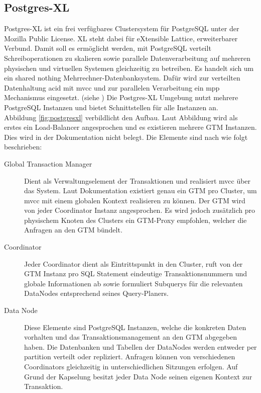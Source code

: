 \subsection{Postgres-XL}
\label{grundlagen:postgresxl}
Postgres-XL ist ein frei verfügbares Clustersystem für PostgreSQL unter der Mozilla Public License.
XL steht dabei für eXtensible Lattice, erweiterbarer Verbund.
Damit soll es ermöglicht werden, mit PostgreSQL verteilt Schreiboperationen zu skalieren sowie parallele Datenverarbeitung auf mehreren physischen und virtuellen Systemen gleichzeitig zu betreiben.
Es handelt sich um ein shared nothing Mehrrechner-Datenbanksystem.
Dafür wird zur verteilten Datenhaltung \Gls{acid} mit \Gls{mvcc} und zur parallelen Verarbeitung ein \Gls{mpp} Mechanismus eingesetzt. (siehe \cite{website:postgresxl-about})
Die Postgres-XL Umgebung nutzt mehrere PostgreSQL Instanzen und bietet Schnittstellen für alle Instanzen an.\\
Abbildung \ref{fig:postgresxl} verbildlicht den Aufbau.
Laut Abbildung wird als erstes ein Load-Balancer angesprochen und es existieren mehrere GTM Instanzen.
Dies wird in der Dokumentation nicht belegt.
Die Elemente sind nach \cite{website:postgresxl-about} wie folgt beschrieben:
\begin{description}
\item[Global Transaction Manager] Dient als Verwaltungselement der Transaktionen und realisiert \Gls{mvcc} über das System. Laut Dokumentation existiert genau ein GTM pro Cluster, um \Gls{mvcc}  mit einem globalen Kontext realisieren zu können. Der GTM wird von jeder Coordinator Instanz angesprochen. Es wird jedoch zusätzlich pro physischem Knoten des Clusters ein GTM-Proxy empfohlen, welcher die Anfragen an den GTM bündelt.
\item[Coordinator] Jeder Coordinator dient als Eintrittspunkt in den Cluster, ruft von der GTM Instanz pro SQL Statement eindeutige Transaktionsnummern und globale Informationen ab sowie formuliert Subquerys für die relevanten DataNodes entsprechend seines Query-Planers.
\item[Data Node] Diese Elemente sind PostgreSQL Instanzen, welche die konkreten Daten vorhalten und das Transaktionsmanagement an den GTM abgegeben haben. Die Datenbanken und Tabellen der DataNodes werden entweder per partition verteilt oder repliziert. Anfragen können von verschiedenen Coordinators gleichzeitig in unterschiedlichen Sitzungen erfolgen. Auf Grund der Kapselung besitzt jeder Data Node seinen eigenen Kontext zur Transaktion.
\end{description}
